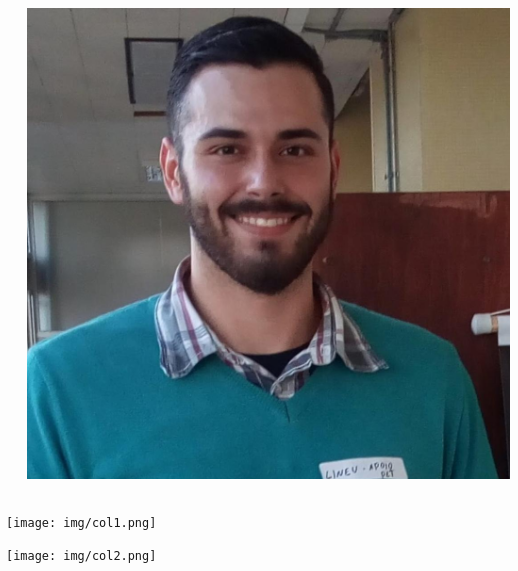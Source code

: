 \documentclass[10pt,
  aspectratio=169,
  serif,
  mathserif,
  professionalfont,
  compress,
  handout,
  ]{beamer}\usepackage[]{graphicx}\usepackage[]{color}
\begin{document}
\begin{frame}
\begin{columns}
\begin{column}{0.7\textwidth}
\begin{itemize}
  \end{itemize}
\end{column}
\begin{column}{0.3\textwidth}  %
    \begin{center}
     \includegraphics[width=\textwidth]{img/eu3.jpeg}
     \end{center}
\end{column}
\end{columns}
\end{frame}

\begin{frame}[c, allowframebreaks]

\begin{center}  
    \texttt{[image: img/col1.png]}  
  \end{center}

\end{frame}

\begin{frame}[c, allowframebreaks]

\begin{center}  
    \texttt{[image: img/col2.png]}  
  \end{center}

\end{frame}
\end{document}
